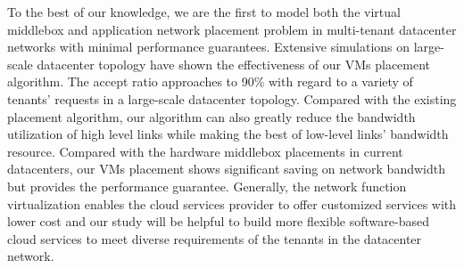 \documentclass[review]{elsarticle}
\begin{document}


To the best of our knowledge, we are the first to model both the  virtual middlebox and application network placement problem in multi-tenant datacenter networks with minimal performance guarantees. Extensive simulations on large-scale datacenter topology have shown the effectiveness of our VMs placement algorithm. The accept ratio approaches to 90\% with regard to a variety of tenants' requests in a large-scale datacenter topology. Compared with the existing placement algorithm, our algorithm can also greatly reduce the bandwidth utilization of high level links while making the best of low-level links' bandwidth resource. %
Compared with the hardware middlebox placements in current datacenters, our VMs placement shows significant saving on network bandwidth but provides the performance guarantee. Generally, the network function virtualization enables the cloud services provider to offer customized services with lower cost and our study will be helpful to build more flexible software-based cloud services to meet diverse requirements of  the tenants in the datacenter network.

\end{document}
